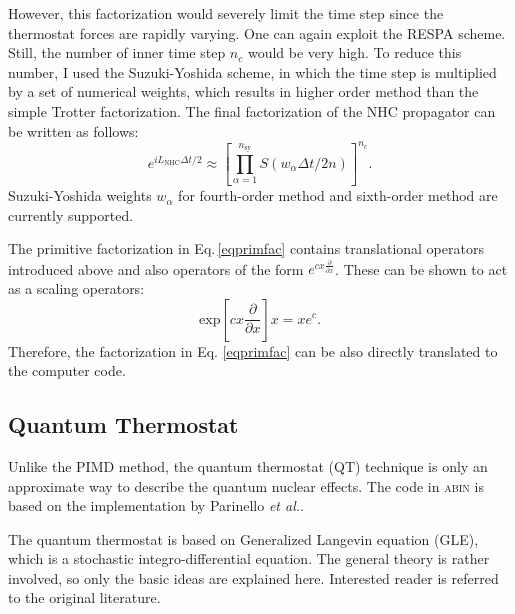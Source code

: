 \documentclass[12pt,a4paper]{article}
\begin{document}
However, this factorization would severely limit the time step since the thermostat forces are rapidly varying. One can again exploit the RESPA scheme. Still, the number of inner time step $n_c$ would be very high. To reduce this number, I used the Suzuki-Yoshida scheme\cite{Yoshida1990}, in which the time step is multiplied by a set of numerical weights, which results in higher order method than the simple Trotter factorization. 
The final factorization of the NHC propagator can be written as follows:
\begin{equation}
e^{iL_{\mathrm{NHC}}\Delta t/2} \approx \left[ \prod_{\alpha=1}^{n_{\mathrm{sy}}}S(w_\alpha\Delta t/2n) \right]^{n_c}   .
\end{equation}
Suzuki-Yoshida weights $w_\alpha$ for fourth-order method and sixth-order method are currently supported.

The primitive factorization in Eq.\,\ref{eqprimfac} contains translational operators introduced above and also operators of the form $e^{cx\frac{\partial}{\partial x}}$. These can be shown to act as a scaling operators:
\begin{equation}
\mathrm{exp}\left[cx\frac{\partial}{\partial x}\right] x = xe^c  .
\end{equation}
Therefore, the factorization in Eq. \ref{eqprimfac} can be also directly translated to the computer code.

\newpage
\subsection{Quantum Thermostat}
Unlike the PIMD method, the quantum thermostat (QT) technique is only an approximate way to describe the quantum nuclear effects. The code in \textsc{abin} is based on the implementation by Parinello \textit{et al.}\cite{Ceriotti2010d}.

The quantum thermostat is based on Generalized Langevin equation (GLE), which is a stochastic integro-differential equation. The general theory is rather involved, so only the basic ideas are explained here. Interested reader is referred to the original literature\cite{Ceriotti2010d}.
\end{document}
